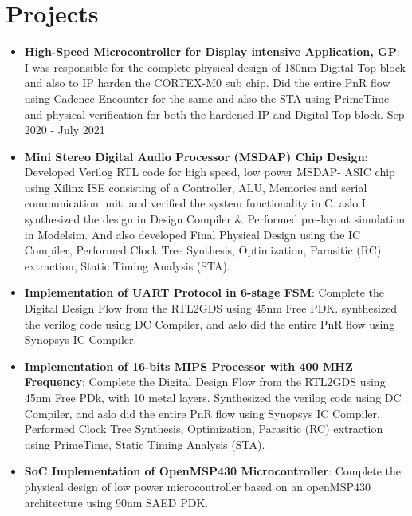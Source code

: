 \documentclass[a4paper,20pt]{article}
\newcommand{\resumeItem}[2]{
	\item\small{
		\textbf{#1}{: #2 \vspace{-2pt}}
	}
}
\newcommand{\resumeSubItem}[2]{\resumeItem{#1}{#2}\vspace{-3pt}}
\newcommand{\resumeSubHeadingListStart}{\begin{itemize}[leftmargin=*]}
\newcommand{\resumeSubHeadingListEnd}{\end{itemize}}
\begin{document}
	\section{Projects}
	\resumeSubHeadingListStart
	\resumeSubItem{High-Speed Microcontroller for Display intensive Application, GP}{I was responsible for the complete physical design of 180nm Digital Top block and also to IP harden the CORTEX-M0 sub chip. Did the entire PnR flow using Cadence Encounter for the same and also the STA using PrimeTime and physical verification for both the hardened IP and Digital Top block.} \hspace{13cm} {Sep 2020 - July 2021}
	\vspace{2pt}
	\resumeSubItem{Mini Stereo Digital Audio Processor (MSDAP) Chip Design}{Developed Verilog RTL code for high speed, low power MSDAP- ASIC chip using Xilinx ISE consisting of a Controller, ALU, Memories and serial communication unit, and verified the system functionality in C. aslo I synthesized the design in Design Compiler \& Performed pre-layout simulation in Modelsim. And also developed Final Physical Design using the IC Compiler, Performed Clock Tree Synthesis, Optimization, Parasitic (RC) extraction, Static Timing Analysis (STA).} \hspace{7.3cm}{Jan 2021 - Mar2021}
	\vspace{2pt}
	\resumeSubItem{Implementation of UART Protocol in 6-stage FSM}{Complete the Digital Design Flow from the RTL2GDS using 45nm Free PDK. synthesized the verilog code using DC Compiler, and aslo did the entire PnR flow using Synopsys IC Compiler.}
	\vspace{2pt}
	\resumeSubItem{Implementation of 16-bits MIPS Processor with 400 MHZ Frequency}{Complete the Digital Design Flow from the RTL2GDS using 45nm Free PDk, with 10 metal layers. Synthesized the verilog code using DC Compiler, and aslo did the entire PnR flow using Synopsys IC Compiler. Performed Clock Tree Synthesis, Optimization, Parasitic (RC) extraction using PrimeTime, Static Timing Analysis (STA).} \hspace{7.8cm}{Jan 2021 - Mar2021}
	\vspace{2pt}
	\resumeSubItem{SoC Implementation of OpenMSP430 Microcontroller}{Complete the physical design of low power microcontroller based on an openMSP430 architecture using 90nm SAED PDK.}\hspace{4.9cm}{Dec 2021 - Jan 2022}
	\resumeSubHeadingListEnd
	
	\vspace{-5pt}
	
\end{document}
